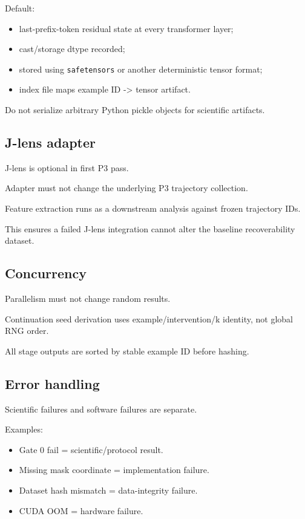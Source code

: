 Default:

\begin{itemize}
\tightlist
\item
  last-prefix-token residual state at every transformer layer;
\item
  cast/storage dtype recorded;
\item
  stored using \passthrough{\lstinline!safetensors!} or another deterministic tensor format;
\item
  index file maps example ID -\textgreater{} tensor artifact.
\end{itemize}

Do not serialize arbitrary Python pickle objects for scientific artifacts.

\subsection{J-lens adapter}\label{j-lens-adapter}

J-lens is optional in first P3 pass.

Adapter must not change the underlying P3 trajectory collection.

Feature extraction runs as a downstream analysis against frozen trajectory IDs.

This ensures a failed J-lens integration cannot alter the baseline recoverability dataset.

\subsection{Concurrency}\label{concurrency}

Parallelism must not change random results.

Continuation seed derivation uses example/intervention/k identity, not global RNG order.

All stage outputs are sorted by stable example ID before hashing.

\subsection{Error handling}\label{error-handling}

Scientific failures and software failures are separate.

Examples:

\begin{itemize}
\tightlist
\item
  Gate 0 fail = scientific/protocol result.
\item
  Missing mask coordinate = implementation failure.
\item
  Dataset hash mismatch = data-integrity failure.
\item
  CUDA OOM = hardware failure.
\end{itemize}

